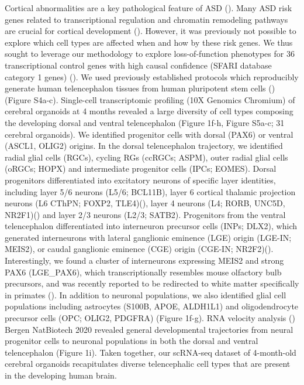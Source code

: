 Cortical abnormalities are a key pathological feature of ASD (\cite{torre-ubieta_advancing_2016,chen_emerging_2015}). Many ASD risk genes related to transcriptional regulation and chromatin remodeling pathways are crucial for cortical development (\cite{study_synaptic_2014,trevino_chromatin_2021}). However, it was previously not possible to explore which cell types are affected when and how by these risk genes. We thus sought to leverage our methodology to explore loss-of-function phenotypes for 36 transcriptional control genes with high causal confidence (SFARI database category 1 genes) (\cite{satterstrom_large-scale_2020}).
We used previously established protocols which reproducibly generate human telencephalon tissues from human pluripotent stem cells (\cite{lancaster_cerebral_2013,eichmuller_amplification_2022}) (Figure S4a-c). Single-cell transcriptomic profiling (10X Genomics Chromium) of cerebral organoids at 4 months revealed a large diversity of cell types composing the developing dorsal and ventral telencephalon (Figure 1f-h, Figure S5a-c; 31 cerebral organoids). We identified progenitor cells with dorsal (PAX6) or ventral (ASCL1, OLIG2) origins. In the dorsal telencephalon trajectory, we identified radial glial cells (RGCs), cycling RGs (ccRGCs; ASPM), outer radial glial cells (oRGCs; HOPX) and intermediate progenitor cells (IPCs; EOMES). Dorsal progenitors differentiated into excitatory neurons of specific layer identities, including layer 5/6 neurons (L5/6; BCL11B), layer 6 cortical thalamic projection neurons (L6 CThPN; FOXP2, TLE4)(\cite{tsyporin_transcriptional_2021}),  layer 4 neurons (L4; RORB, UNC5D, NR2F1)(\cite{zhong_identification_2004,oishi_identity_2016}) and layer 2/3 neurons (L2/3; SATB2). Progenitors from the ventral telencephalon differentiated into interneuron precursor cells (INPs; DLX2), which generated interneurons with lateral ganglionic eminence (LGE) origin (LGE-IN; MEIS2), or caudal ganglionic eminence (CGE) origin (CGE-IN; NR2F2)(\cite{shi_mouse_2021}). Interestingly, we found a cluster of interneurons expressing MEIS2 and strong PAX6 (LGE\_PAX6), which transcriptionally resembles mouse olfactory bulb precursors, and was recently reported to be redirected to white matter specifically in primates (\cite{schmitz_development_2022}). In addition to neuronal populations, we also identified glial cell populations including astrocytes (S100B, APOE, ALDH1L1) and oligodendrocyte precursor cells (OPC; OLIG2, PDGFRA) (Figure 1f-g). RNA velocity analysis (\cite{manno_rna_2018}) {Bergen NatBiotech 2020} revealed general developmental trajectories from neural progenitor cells to neuronal populations in both the dorsal and ventral telencephalon (Figure 1i). Taken together, our scRNA-seq dataset of 4-month-old cerebral organoids recapitulates diverse telencephalic cell types that are present in the developing human brain. 

